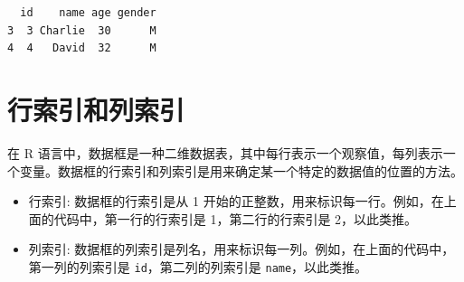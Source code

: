 \documentclass[
  letterpaper,
  DIV=11,
  numbers=noendperiod]{scrreprt}
\newenvironment{Shaded}{\begin{snugshade}}{\end{snugshade}}
\newcommand{\AttributeTok}[1]{\textcolor[rgb]{0.40,0.45,0.13}{#1}}
\newcommand{\CommentTok}[1]{\textcolor[rgb]{0.37,0.37,0.37}{#1}}
\newcommand{\ConstantTok}[1]{\textcolor[rgb]{0.56,0.35,0.01}{#1}}
\newcommand{\DecValTok}[1]{\textcolor[rgb]{0.68,0.00,0.00}{#1}}
\newcommand{\FunctionTok}[1]{\textcolor[rgb]{0.28,0.35,0.67}{#1}}
\newcommand{\NormalTok}[1]{\textcolor[rgb]{0.00,0.23,0.31}{#1}}
\newcommand{\OtherTok}[1]{\textcolor[rgb]{0.00,0.23,0.31}{#1}}
\newcommand{\SpecialCharTok}[1]{\textcolor[rgb]{0.37,0.37,0.37}{#1}}
\newcommand{\StringTok}[1]{\textcolor[rgb]{0.13,0.47,0.30}{#1}}
\providecommand{\tightlist}{%
  \setlength{\itemsep}{0pt}\setlength{\parskip}{0pt}}\usepackage{longtable,booktabs,array}
\begin{document}
\begin{Shaded}
\end{Shaded}

\begin{verbatim}
  id    name age gender
3  3 Charlie  30      M
4  4   David  32      M
\end{verbatim}

\hypertarget{ux884cux7d22ux5f15ux548cux5217ux7d22ux5f15}{%
\section{行索引和列索引}\label{ux884cux7d22ux5f15ux548cux5217ux7d22ux5f15}}

在 R
语言中，数据框是一种二维数据表，其中每行表示一个观察值，每列表示一个变量。数据框的行索引和列索引是用来确定某一个特定的数据值的位置的方法。

\begin{itemize}
\tightlist
\item
  行索引: 数据框的行索引是从 1
  开始的正整数，用来标识每一行。例如，在上面的代码中，第一行的行索引是
  1，第二行的行索引是 2，以此类推。
\item
  列索引:
  数据框的列索引是列名，用来标识每一列。例如，在上面的代码中，第一列的列索引是
  \texttt{id}，第二列的列索引是 \texttt{name}，以此类推。
\end{itemize}
\end{document}
